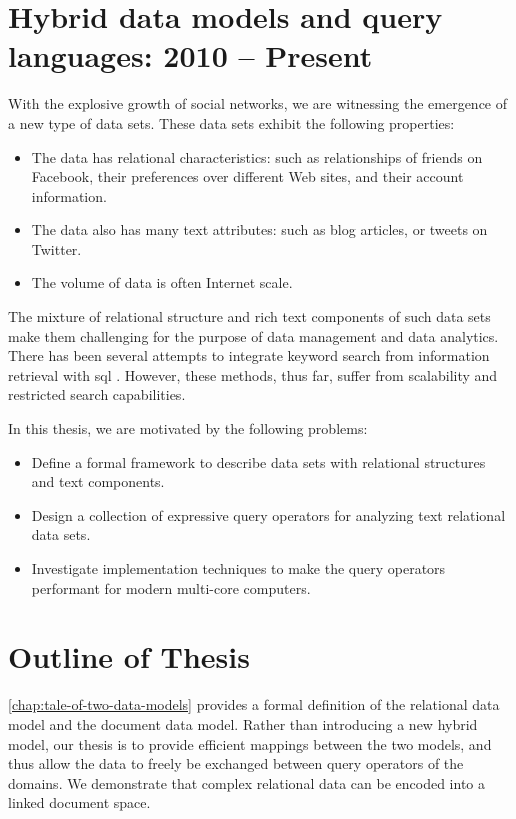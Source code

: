 	\section{Hybrid data models and query languages: 2010 -- Present}
		With the explosive growth of social networks, we are witnessing the emergence of a new type of data sets.  These data sets exhibit the following properties:
		
		\begin{itemize}
			\item The data has relational characteristics: such as relationships of friends on Facebook, their preferences over different Web sites, and their account information.
			\item The data also has many text attributes: such as blog articles, or tweets on Twitter.
			\item The volume of data is often Internet scale.
		\end{itemize}
		
		The mixture of relational structure and rich text components of such data sets make them challenging for the purpose of data management and data analytics.  There has been several attempts to integrate keyword search from information retrieval with \gls{sql} \cite{banks-02, fuzzy-11, ir-03}.  However, these methods, thus far, suffer from scalability and restricted search capabilities.
		
		In this thesis, we are motivated by the following problems:
		
		\begin{itemize}
			\item Define a formal framework to describe data sets with relational structures and text components.
			\item Design a collection of expressive query operators for analyzing text relational data sets.
			\item Investigate implementation techniques to make the query operators performant for modern multi-core computers.
		\end{itemize}
		
	\section{Outline of Thesis}
		\cref{chap:tale-of-two-data-models} provides a formal definition of the relational data model and the document data model.  Rather than introducing a new hybrid model, our thesis is to provide efficient mappings between the two models, and thus allow the data to freely be exchanged between query operators of the domains.  We demonstrate that complex relational data can be encoded into a linked document space.
				
